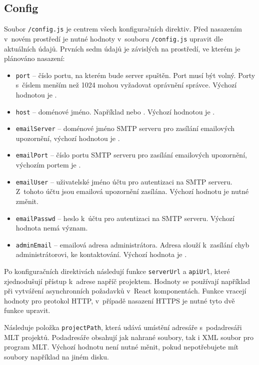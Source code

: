 \subsection{Config\label{cap:config}}
Soubor \texttt{/config.js} je centrem všech konfiguračních direktiv.  Před nasazením v~novém prostředí je nutné hodnoty v~souboru \texttt{/config.js} upravit dle aktuálních údajů. Prvních sedm údajů je závislých na prostředí, ve kterém je plánováno nasazení:
\begin{itemize}
\item \texttt{port} -- číslo portu, na kterém bude server spuštěn. Port musí být volný. Porty s~číslem menším než 1024 mohou vyžadovat oprávnění správce. Výchozí hodnotou je .
\item \texttt{host} -- doménové jméno. Například  nebo . Výchozí hodnotou je .
\item \texttt{emailServer} -- doménové jméno SMTP serveru pro zasílání emailových upozornění, výchozí hodnotou je .
\item \texttt{emailPort} -- číslo portu SMTP serveru pro zasílání emailových upozornění, výchozím portem je .
\item \texttt{emailUser} -- uživatelské jméno účtu pro autentizaci na SMTP serveru. Z~tohoto účtu jsou emailová upozornění zasílána. Výchozí hodnotu  je nutné změnit.
\item \texttt{emailPasswd} -- heslo k~účtu pro autentizaci na SMTP serveru. Výchozí hodnota nemá význam.
\item \texttt{adminEmail} -- emailová adresa administrátora. Adresa slouží k~zasílání chyb administrátorovi, ke kontaktování. Výchozí hodnota je .
\end{itemize}

Po konfiguračních direktivách následují funkce \texttt{serverUrl} a \texttt{apiUrl}, které zjednodušují přístup k~adrese napříč projektem. Hodnoty se používají například při vytváření asynchronních požadavků v~React komponentách. Funkce vracejí hodnoty pro protokol HTTP, v~případě nasazení HTTPS je nutné tyto dvě funkce upravit.

Následuje položka \texttt{projectPath}, která udává umístění adresáře s~podadresáři MLT projektů. Podadresáře obsahují jak nahrané soubory, tak i XML soubor pro program MLT. Výchozí hodnotu  není nutné měnit, pokud nepotřebujete mít soubory například na jiném disku.

